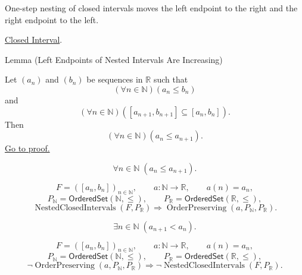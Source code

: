 \begin{remark*}[Interpretation]
One-step nesting of closed intervals moves the left endpoint to the right
and the right endpoint to the left.
\end{remark*}

\begin{dependencies}
\hyperref[def:closed-interval]{Closed Interval}.
\end{dependencies}

\begin{lemmabox}{Lemma (Left Endpoints of Nested Intervals Are Increasing)}
\begin{lemma}
\label{lem:left-endpoints-nested-intervals-increasing}
Let $(a_n)$ and $(b_n)$ be sequences in $\mathbb{R}$ such that
\[
  (\forall n\in\mathbb{N})(a_n\leq b_n)
\]
and
\[
  (\forall n\in\mathbb{N})([a_{n+1},b_{n+1}]\subseteq [a_n,b_n]).
\]
Then
\[
  (\forall n\in\mathbb{N})(a_n\leq a_{n+1}).
\]
\hyperref[prf:left-endpoints-nested-intervals-increasing]{Go to proof.}
\end{lemma}
\end{lemmabox}

\begin{remark*}
\[
\forall n\in\mathbb{N}\;(a_n\le a_{n+1}).
\]
\end{remark*}

\begin{remark*}
\[
F=([a_n,b_n])_{n\in\mathbb{N}},\qquad
a\colon\mathbb{N}\longrightarrow\mathbb{R},\qquad a(n)=a_n,
\]
\[
P_{\mathbb{N}}=\mathsf{OrderedSet}(\mathbb{N},\leq),\qquad
P_{\mathbb{R}}=\mathsf{OrderedSet}(\mathbb{R},\leq),
\]
\[
\operatorname{NestedClosedIntervals}(F,P_{\mathbb{R}})
\Longrightarrow
\operatorname{OrderPreserving}(a,P_{\mathbb{N}},P_{\mathbb{R}}).
\]
\end{remark*}

\begin{remark*}
\[
\exists n\in\mathbb{N}\;(a_{n+1}<a_n).
\]
\end{remark*}

\begin{remark*}
\[
F=([a_n,b_n])_{n\in\mathbb{N}},\qquad
a\colon\mathbb{N}\longrightarrow\mathbb{R},\qquad a(n)=a_n,
\]
\[
P_{\mathbb{N}}=\mathsf{OrderedSet}(\mathbb{N},\leq),\qquad
P_{\mathbb{R}}=\mathsf{OrderedSet}(\mathbb{R},\leq),
\]
\[
\neg\operatorname{OrderPreserving}(a,P_{\mathbb{N}},P_{\mathbb{R}})
\Longrightarrow
\neg\operatorname{NestedClosedIntervals}(F,P_{\mathbb{R}}).
\]
\end{remark*}

